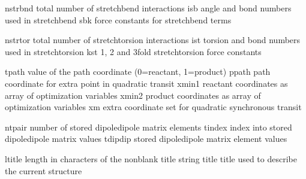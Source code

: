 \documentclass[letterpaper,11pt,english]{sphinxmanual}
\begin{document}
\begin{sphinxVerbatim}[commandchars=\\\{\}]
nstrbnd         total number of stretch\PYGZhy{}bend interactions
isb             angle and bond numbers used in stretch\PYGZhy{}bend
sbk             force constants for stretch\PYGZhy{}bend terms
\end{sphinxVerbatim}


\begin{sphinxVerbatim}[commandchars=\\\{\}]
nstrtor         total number of stretch\PYGZhy{}torsion interactions
ist             torsion and bond numbers used in stretch\PYGZhy{}torsion
kst             1\PYGZhy{}, 2\PYGZhy{} and 3\PYGZhy{}fold stretch\PYGZhy{}torsion force constants
\end{sphinxVerbatim}


\begin{sphinxVerbatim}[commandchars=\\\{\}]
tpath           value of the path coordinate (0=reactant, 1=product)
ppath           path coordinate for extra point in quadratic transit
xmin1           reactant coordinates as array of optimization variables
xmin2           product coordinates as array of optimization variables
xm              extra coordinate set for quadratic synchronous transit
\end{sphinxVerbatim}


\begin{sphinxVerbatim}[commandchars=\\\{\}]
ntpair          number of stored dipole\PYGZhy{}dipole matrix elements
tindex          index into stored dipole\PYGZhy{}dipole matrix values
tdipdip         stored dipole\PYGZhy{}dipole matrix element values
\end{sphinxVerbatim}


\begin{sphinxVerbatim}[commandchars=\\\{\}]
ltitle          length in characters of the nonblank title string
title           title used to describe the current structure
\end{sphinxVerbatim}
\end{document}
